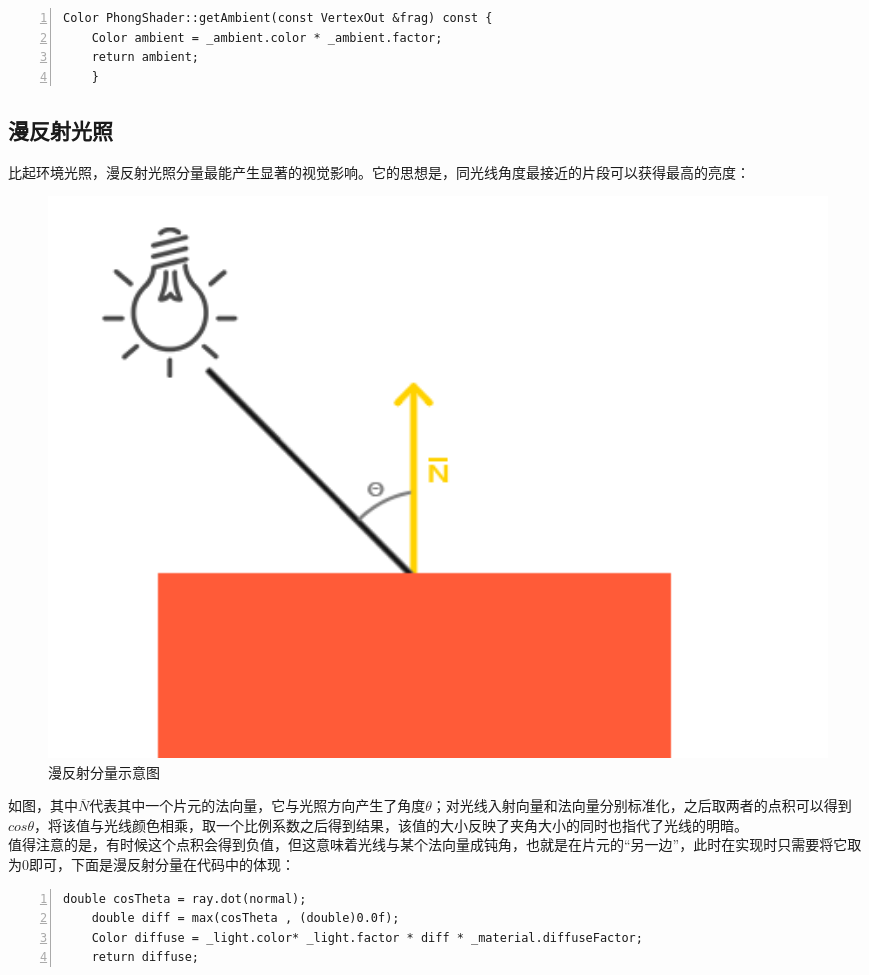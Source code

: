 \begin{spacing}{2.5}
   
	\begin{lstlisting}[language={[ANSI]C},numbers=left,numberstyle=\tiny,%frame=shadowbox,
   rulesepcolor=\color{red!20!green!20!blue!20},
   keywordstyle=\color{blue!70!black},
   commentstyle=\color{blue!90!},
   basicstyle=\ttfamily]
	Color PhongShader::getAmbient(const VertexOut &frag) const {
    Color ambient = _ambient.color * _ambient.factor;
    return ambient;
	}
	\end{lstlisting}
	
	\subsection{漫反射光照}
	
	比起环境光照，漫反射光照分量最能产生显著的视觉影响。它的思想是，同光线角度最接近的片段可以获得最高的亮度：
	
	\begin{figure}[H]
    	\centering
		\includegraphics[width=1.0\textwidth]{images/diffuse_light.png}
		\caption{漫反射分量示意图}
		\label{diffuse_light}
    \end{figure}
	
	如图，其中$\overline N$代表其中一个片元的法向量，它与光照方向产生了角度$\theta$；对光线入射向量和法向量分别标准化，之后取两者的点积可以得到$cos\theta$，将该值与光线颜色相乘，取一个比例系数之后得到结果，该值的大小反映了夹角大小的同时也指代了光线的明暗。\\
	值得注意的是，有时候这个点积会得到负值，但这意味着光线与某个法向量成钝角，也就是在片元的“另一边”，此时在实现时只需要将它取为0即可，下面是漫反射分量在代码中的体现：
	
	\begin{lstlisting}[language={[ANSI]C},numbers=left,numberstyle=\tiny,%frame=shadowbox,
   rulesepcolor=\color{red!20!green!20!blue!20},
   keywordstyle=\color{blue!70!black},
   commentstyle=\color{blue!90!},
   basicstyle=\ttfamily]
	double cosTheta = ray.dot(normal);
    double diff = max(cosTheta , (double)0.0f);
    Color diffuse = _light.color* _light.factor * diff * _material.diffuseFactor;
    return diffuse;
	\end{lstlisting}
	

\end{spacing}
